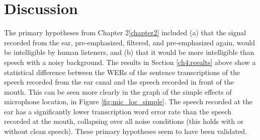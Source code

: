 \documentclass[dissertation,copyright]{uathesis}
\begin{document}
\section{Discussion}



The primary hypotheses from Chapter 2\ref{chapter2} included (a) that the signal recorded from the ear, pre-emphasized, filtered, and pre-emphasized again, would be intelligible by human listeners, and (b) that it would be more intelligible than speech with a noisy background.  The results in Section \ref{ch4:results} above show a statistical difference between the WERs of the sentence transcriptions of the speech recorded from the ear canal and the speech recorded in front of the mouth.  This can be seen more clearly in the graph of the simple effects of microphone location, in Figure \ref{fig:mic_loc_simple}.  The speech recorded at the ear has a significantly lower transcription word error rate than the speech recorded at the mouth, collapsing over all noise conditions (this holds with or without clean speech). These primary hypotheses seem to have been validated.
\end{document}
